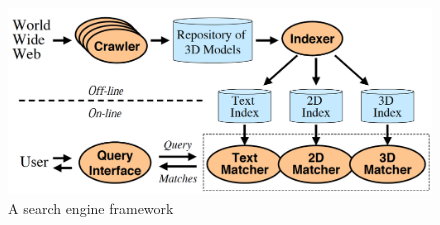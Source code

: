 \begin{figure}[b]
\centering
    \includegraphics[width=1.0\columnwidth]{fig/search/funk_searchEngine.png}
    \vspace{-.4cm}
    \caption{A search engine framework \cite{Funkhouser:2003:ASE} }
    \vspace{-.6cm}    
    \label{fig:searchEngine}
\end{figure}

